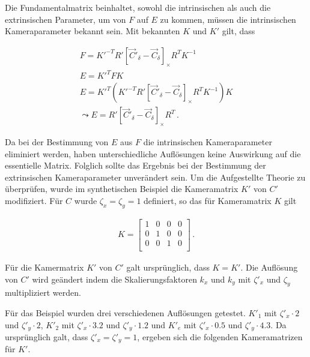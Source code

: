 Die Fundamentalmatrix beinhaltet, sowohl die intrinsischen als auch die extrinsischen Parameter, um von $F$ auf $E$ zu kommen, müssen die intrinsischen Kameraparameter bekannt sein. Mit bekannten $K$ und $K'$ gilt, dass

\begin{gather}
	F = K'^{-T}R' \left[ \overrightarrow{C}'_\delta-\overrightarrow{C}_\delta\right]_\times R^TK^{-1}\\
	E = K'^{T}FK\\
	E= K'^T (K'^{-T}R' \left[ \overrightarrow{C}'_\delta-\overrightarrow{C}_\delta\right]_\times R^TK^{-1}) K\\
	\leadsto E = R' \left[ \overrightarrow{C}'_\delta-\overrightarrow{C}_\delta\right]_\times R^T	\, .	
\end{gather}

Da bei der Bestimmung von $E$ aus $F$ die intrinsischen Kameraparameter eliminiert werden, haben unterschiedliche Auflösungen keine Auswirkung auf die essentielle Matrix. Folglich sollte das Ergebnis bei der Bestimmung der extrinsischen Kameraparameter unverändert sein. Um die Aufgestellte Theorie zu überprüfen, wurde im synthetischen Beispiel die Kameramatrix $K'$ von $C'$ modifiziert. Für $C$ wurde $\zeta_x = \zeta_y = 1$ definiert, so das für Kameramatrix $K$ gilt




\begin{gather}
	K = \begin{bmatrix}
		1&0&0&0\\
		0&1&0&0\\
		0&0&1&0\\
	\end{bmatrix} \, .
\end{gather}


Für die Kamermatrix $K'$ von $C'$ galt ursprünglich, dass $K = K'$. Die Auflösung von $C'$ wird geändert indem die Skalierungsfaktoren $k_x$ und $k_y$ mit $\zeta'_x$ und $\zeta_y$ multipliziert werden. 

Für das Beispiel wurden drei verschiedenen Auflösungen getestet.  $K'_1$ mit $\zeta'_x \cdot 2$ und $\zeta'_y \cdot 2$, $K'_2$ mit $\zeta'_x \cdot 3.2$ und $\zeta'_y \cdot 1.2$ und $K'_e$ mit $\zeta'_x \cdot 0.5$ und $\zeta'_y \cdot 4.3$. Da ursprünglich galt, dass $\zeta'_x =\zeta'_y = 1$, ergeben sich die folgenden Kameramatrizen für $K'$.



